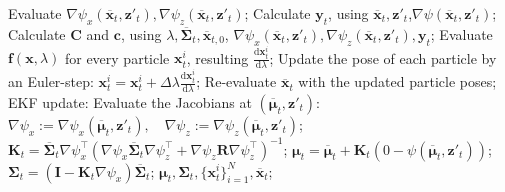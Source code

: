 \begin{algorithm}
\begin{algorithmic}[1]
    \State Evaluate $\nabla\psi_x(\overline{\mathbf{x}}_t,\mathbf{z}'_t),\nabla\psi_z(\overline{\mathbf{x}}_t,\mathbf{z}'_t)$;
    \Comment{\eqref{eq:measmodel-jacobi-x}-\eqref{eq:measmodel-jacobi-z}}
    \State Calculate $\mathbf{y}_t$, using $\overline{\mathbf{x}}_t,\mathbf{z}'_t$,$\nabla\psi(\overline{\mathbf{x}}_t,\mathbf{z}'_t)$; \Comment{\eqref{eq:edh-implicit-y},\eqref{eq:observation-function}}
    \State Calculate $\mathbf{C}$ and $\mathbf{c}$, using
    $\lambda,\overline{\boldsymbol\Sigma}_t, \overline{\mathbf{x}}_{t,0}$,
    $\nabla\psi_x(\overline{\mathbf{x}}_t,\mathbf{z}'_t),\nabla\psi_z(\overline{\mathbf{x}}_t,\mathbf{z}'_t), \mathbf{y}_t$;
    \Comment{\eqref{eq:edh-C-impl}-\eqref{eq:edh-c-impl}}
    \State Evaluate $\mathbf{f}(\mathbf{x},\lambda)$ for every particle $\mathbf{x}_t^{i}$, resulting $\frac{\mathrm{d}\mathbf{x}_t^i}{\mathrm{d}\lambda}$;
    \Comment{\eqref{eq:edh-flow-vector}}
    \State Update the pose of each particle by an Euler-step:
    \State\indent $\mathbf{x}_t^{i} = \mathbf{x}_t^{i} + \Delta\lambda\frac{\mathrm{d}\mathbf{x}_t^i}{\mathrm{d}\lambda}$;
    \State Re-evaluate $\overline{\mathbf{x}}_t$ with the updated particle poses;
    \EndFor
    \State EKF update:
    \State\indent Evaluate the Jacobians at $(\overline{\boldsymbol{\mu}}_t,\mathbf{z}'_t)$:
    \Comment{\eqref{eq:motmodel-jacobi-x}-\eqref{eq:motmodel-jacobi-u}}
    \State\indent\indent $\nabla\psi_x := \nabla\psi_x(\overline{\boldsymbol{\mu}}_t,\mathbf{z}'_t), \quad \nabla\psi_z := \nabla\psi_z(\overline{\boldsymbol{\mu}}_t,\mathbf{z}'_t)$;
    \State\indent $\mathbf{K}_t = \overline{\mathbf{\Sigma}}_t\nabla \psi_x^\top\left(\nabla \psi_x\overline{\mathbf{\Sigma}}_t\nabla \psi_z^\top+
      \nabla \psi_z\mathbf{R}\nabla \psi^{\top}_z\right)^{-1}$;
    \State\indent $\boldsymbol{\mu}_t = \overline{\boldsymbol{\mu}}_t + \mathbf{K}_t\left(0-\psi(\overline{\boldsymbol{\mu}}_t,\mathbf{z}'_t)\right)$;
    \Comment{\eqref{eq:observation-function}}
    \State\indent $\mathbf{\Sigma}_t = \left(\mathbf{I}-\mathbf{K}_t\nabla \psi_x\right)\overline{\mathbf{\Sigma}}_t$;
    \State\Return $\boldsymbol{\mu}_t,\boldsymbol{\Sigma}_t,\{\mathbf{x}_t^i\}_{i=1}^{N},\overline{\mathbf{x}}_t$;
  \end{algorithmic}
\end{algorithm}
